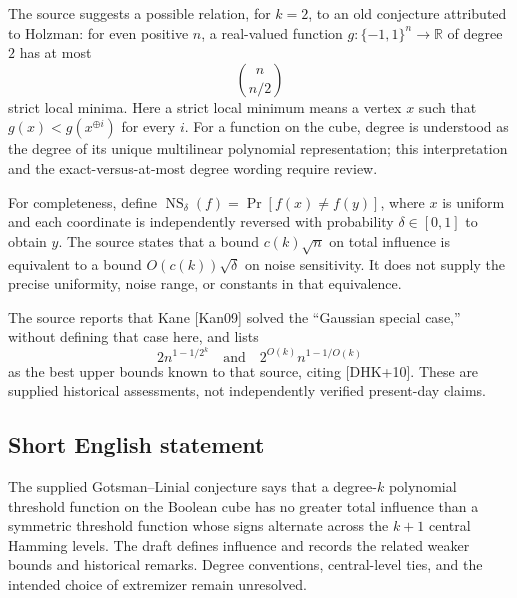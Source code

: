\documentclass[11pt]{article}
\newcommand{\R}{\mathbb{R}}
\begin{document}
The source suggests a possible relation, for \(k=2\), to an old conjecture attributed to Holzman: for even positive \(n\), a real-valued function \(g:\{-1,1\}^n\to\R\) of degree \(2\) has at most
\[
\binom{n}{n/2}
\]
strict local minima. Here a strict local minimum means a vertex \(x\) such that \(g(x)<g(x^{\oplus i})\) for every \(i\). For a function on the cube, degree is understood as the degree of its unique multilinear polynomial representation; this interpretation and the exact-versus-at-most degree wording require review.

For completeness, define \(\operatorname{NS}_{\delta}(f)=\Pr[f(x)\ne f(y)]\), where \(x\) is uniform and each coordinate is independently reversed with probability \(\delta\in[0,1]\) to obtain \(y\). The source states that a bound \(c(k)\sqrt n\) on total influence is equivalent to a bound \(O(c(k))\sqrt\delta\) on noise sensitivity. It does not supply the precise uniformity, noise range, or constants in that equivalence.

The source reports that Kane [Kan09] solved the ``Gaussian special case,'' without defining that case here, and lists
\[
2n^{1-1/2^k}\quad\text{and}\quad 2^{O(k)}n^{1-1/O(k)}
\]
as the best upper bounds known to that source, citing [DHK+10]. These are supplied historical assessments, not independently verified present-day claims.
\subsection{Short English statement}
The supplied Gotsman--Linial conjecture says that a degree-\(k\) polynomial threshold function on the Boolean cube has no greater total influence than a symmetric threshold function whose signs alternate across the \(k+1\) central Hamming levels. The draft defines influence and records the related weaker bounds and historical remarks. Degree conventions, central-level ties, and the intended choice of extremizer remain unresolved.
\end{document}
